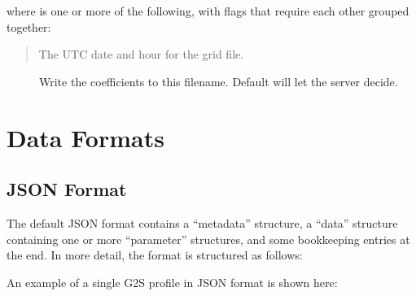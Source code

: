 \documentclass[letterpaper,10pt,english]{sphinxmanual}
\begin{document}
\sphinxAtStartPar
{}

\sphinxAtStartPar
where \sphinxcode{\sphinxupquote{{[}flags{]}}} is one or more of the following, with flags that require each other grouped together:

\sphinxAtStartPar
{}
\begin{quote}

\sphinxAtStartPar
The UTC date and hour for the grid file.
\end{quote}

\sphinxAtStartPar
{}
\begin{description}
\item[{}] \leavevmode
\sphinxAtStartPar
Write the coefficients to this filename.  Default will let the server decide.

\item[{}] \leavevmode
\sphinxAtStartPar
{}

\end{description}


\chapter{Data Formats}
\label{\detokenize{formats:data-formats}}\label{\detokenize{formats:formats}}\label{\detokenize{formats::doc}}

\section{JSON Format}
\label{\detokenize{formats:json-format}}
\sphinxAtStartPar
The default JSON format contains a “metadata” structure, a “data” structure containing one or more “parameter” structures, and some bookkeeping entries at the end.  In more detail, the format is structured as follows:

\sphinxAtStartPar
{}

\sphinxAtStartPar
An example of a single G2S profile in JSON format is shown here:
\end{document}
